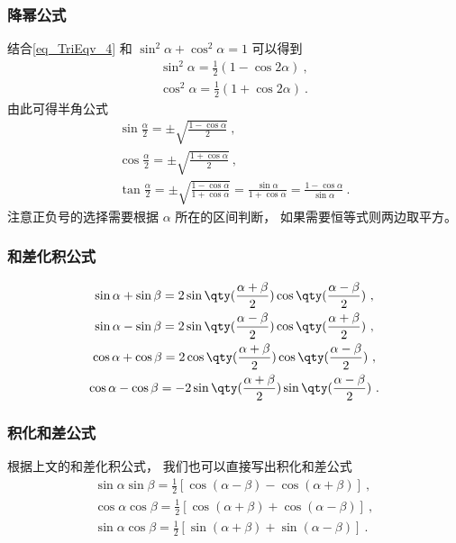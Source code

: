 \subsubsection{降幂公式}
结合\autoref{eq_TriEqv_4} 和 $\sin^2 \alpha + \cos^2 \alpha = 1$ 可以得到
\begin{gather}
\sin^2 \alpha = \frac12 (1- \cos 2\alpha) \label{eq_TriEqv_5}~, \\
\cos^2 \alpha = \frac12 (1+\cos 2\alpha) \label{eq_TriEqv_6}~.
\end{gather}
由此可得半角公式
\begin{gather}
\sin\frac{ \alpha}{2} = \pm\sqrt{\frac{1-\cos \alpha}{2}}~,\\
\cos\frac{ \alpha}{2}= \pm\sqrt{\frac{1+\cos \alpha}{2}}~,\\
\tan\frac{ \alpha}{2} = \pm\sqrt{\frac{1-\cos \alpha}{1+\cos \alpha}} = \frac{\sin \alpha}{1+\cos \alpha} = \frac{1-\cos \alpha}{\sin \alpha}~.
\end{gather}
注意正负号的选择需要根据 $\alpha$ 所在的区间判断， 如果需要恒等式则两边取平方。

\subsubsection{和差化积公式}
\begin{gather}
\sin \alpha + \sin \beta = 2\sin\qty(\frac{\alpha + \beta}{2})\cos\qty(\frac{\alpha - \beta}{2})\label{eq_TriEqv_7}~,\\
\sin \alpha - \sin \beta = 2\sin\qty(\frac{\alpha - \beta}{2})\cos\qty(\frac{\alpha + \beta}{2})\label{eq_TriEqv_8}~,\\
\cos \alpha + \cos \beta = 2\cos\qty(\frac{\alpha+\beta}{2})\cos\qty(\frac{\alpha-\beta}{2})\label{eq_TriEqv_9}~,\\
\cos \alpha - \cos \beta = -2\sin\qty(\frac{\alpha+\beta}{2})\sin\qty(\frac{\alpha-\beta}{2})\label{eq_TriEqv_10}~.
\end{gather}

\subsubsection{积化和差公式}
根据上文的和差化积公式， 我们也可以直接写出积化和差公式
\begin{gather}
\label{eq_TriEqv_11}
\sin \alpha\sin \beta = \frac12 [\cos(\alpha - \beta) - \cos(\alpha + \beta)]~,\\
\label{eq_TriEqv_12}
\cos \alpha\cos \beta = \frac12 [\cos(\alpha + \beta) + \cos(\alpha - \beta)]~,\\
\label{eq_TriEqv_14}
\sin \alpha\cos \beta = \frac12 [\sin(\alpha + \beta) + \sin(\alpha - \beta)]~.
\end{gather}


